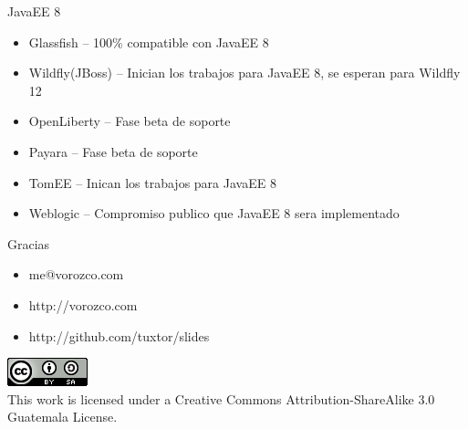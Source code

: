 \documentclass{beamer}
\begin{document}
\begin{frame}{JavaEE 8}
\begin{itemize}
\item Glassfish – 100\% compatible con JavaEE 8
\item Wildfly(JBoss) – Inician los trabajos para JavaEE 8, se esperan para Wildfly 12
\item OpenLiberty – Fase beta de soporte
\item Payara – Fase beta de soporte
\item TomEE – Inican los trabajos para JavaEE 8
\item Weblogic – Compromiso publico que JavaEE 8 sera implementado
\end{itemize}
\end{frame}



\begin{frame}{Gracias}
\begin{itemize}
\item me@vorozco.com
\item http://vorozco.com
\item http://github.com/tuxtor/slides
\end{itemize}
\begin{center}
\includegraphics[width=0.1\linewidth]{Images/cclogo}
\\
This work is licensed under a Creative Commons Attribution-ShareAlike 3.0 Guatemala License.
\end{center}
\end{frame}
\end{document}
